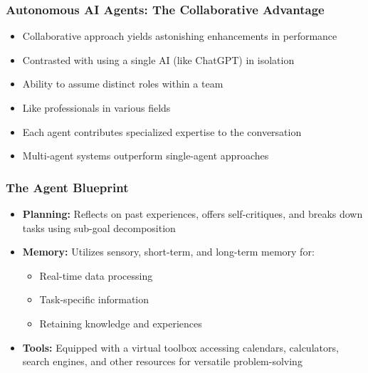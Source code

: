 \begin{frame}[fragile]\frametitle{Autonomous AI Agents: The Collaborative Advantage}
\begin{itemize}
    \item Collaborative approach yields astonishing enhancements in performance
    \item Contrasted with using a single AI (like ChatGPT) in isolation
    \item Ability to assume distinct roles within a team
    \item Like professionals in various fields
    \item Each agent contributes specialized expertise to the conversation
    \item Multi-agent systems outperform single-agent approaches
\end{itemize}
\end{frame}

\begin{frame}[fragile]\frametitle{The Agent Blueprint}
\begin{itemize}
    \item \textbf{Planning:} Reflects on past experiences, offers self-critiques, and breaks down tasks using sub-goal decomposition
    \item \textbf{Memory:} Utilizes sensory, short-term, and long-term memory for:
    \begin{itemize}
        \item Real-time data processing
        \item Task-specific information
        \item Retaining knowledge and experiences
    \end{itemize}
    \item \textbf{Tools:} Equipped with a virtual toolbox accessing calendars, calculators, search engines, and other resources for versatile problem-solving
\end{itemize}
\end{frame}

